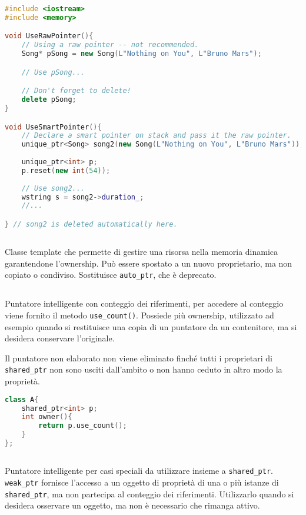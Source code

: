 \begin{lstlisting}[language=C++]
#include <iostream>
#include <memory> 

void UseRawPointer(){
    // Using a raw pointer -- not recommended.
    Song* pSong = new Song(L"Nothing on You", L"Bruno Mars"); 

    // Use pSong...

    // Don't forget to delete!
    delete pSong;   
}

void UseSmartPointer(){
    // Declare a smart pointer on stack and pass it the raw pointer.
    unique_ptr<Song> song2(new Song(L"Nothing on You", L"Bruno Mars"));
    
    unique_ptr<int> p;
    p.reset(new int(54));
    
    // Use song2...
    wstring s = song2->duration_;
    //...

} // song2 is deleted automatically here.

\end{lstlisting}


\subsection{}
Classe template che permette di gestire una risorsa nella memoria dinamica garantendone l'ownership.
Può essere spostato a un nuovo proprietario, ma non copiato o condiviso. Sostituisce \verb|auto_ptr|, che è deprecato. 

\subsection{}
Puntatore intelligente con conteggio dei riferimenti, per accedere al conteggio viene fornito il metodo \verb|use_count()|. Possiede più ownership, utilizzato ad esempio quando si restituisce una copia di un puntatore da un contenitore, ma si desidera conservare l'originale.

Il puntatore non elaborato non viene eliminato finché tutti i proprietari di \verb|shared_ptr| non sono usciti dall'ambito o non hanno ceduto in altro modo la proprietà.

\begin{lstlisting}[language=C++]
class A{
    shared_ptr<int> p;
    int owner(){
        return p.use_count();
    }
}; 
\end{lstlisting}

\subsection{}
Puntatore intelligente per casi speciali da utilizzare insieme a \verb|shared_ptr|.
\verb|weak_ptr| fornisce l'accesso a un oggetto di proprietà di una o più istanze di \verb|shared_ptr|, ma non partecipa al conteggio dei riferimenti. Utilizzarlo quando si desidera osservare un oggetto, ma non è necessario che rimanga attivo.

